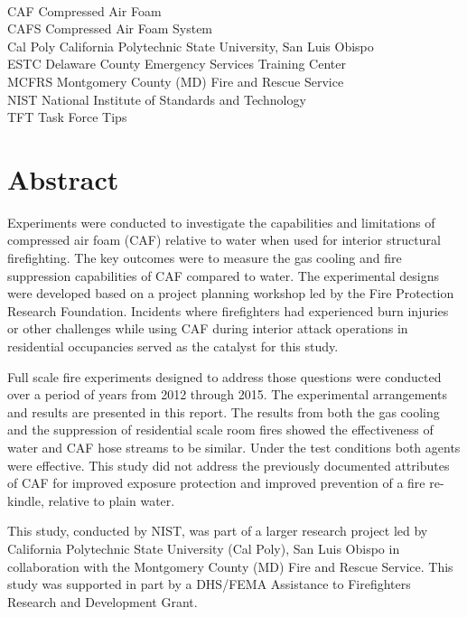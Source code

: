 \documentclass[12pt,oneside]{book}
\begin{document}
\begin{tabbing}
\hspace{1.5in} \= \\
CAF \> Compressed Air Foam \\
CAFS \> Compressed Air Foam System \\
Cal Poly \> California Polytechnic State University, San Luis Obispo \\
ESTC \> Delaware County Emergency Services Training Center \\
MCFRS \> Montgomery County (MD) Fire and Rescue Service \\
NIST \> National Institute of Standards and Technology \\
TFT \> Task Force Tips \\
\end{tabbing}

\mainmatter

\chapter*{\centering Abstract}

Experiments were conducted to investigate the capabilities and limitations of compressed air foam (CAF) relative to water when used for interior structural firefighting. The key outcomes were to measure the gas cooling and fire suppression capabilities of CAF compared to water. The experimental designs were developed based on a project planning workshop led by the Fire Protection Research Foundation. Incidents where firefighters had experienced burn injuries or other challenges while using CAF during interior attack operations in residential occupancies served as the catalyst for this study.

Full scale fire experiments designed to address those questions were conducted over a period of years from 2012 through 2015. The experimental arrangements and results are presented in this report. The results from both the gas cooling and the suppression of residential scale room fires showed the effectiveness of water and CAF hose streams to be similar. Under the test conditions both agents were effective. This study did not address the previously documented attributes of CAF for improved exposure protection and improved prevention of a fire re-kindle, relative to plain water. 

This study, conducted by NIST, was part of a larger research project led by California Polytechnic State University (Cal Poly), San Luis Obispo in collaboration with the Montgomery County (MD) Fire and Rescue Service.  This study was supported in part by a DHS/FEMA Assistance to Firefighters Research and Development Grant.
\end{document}
